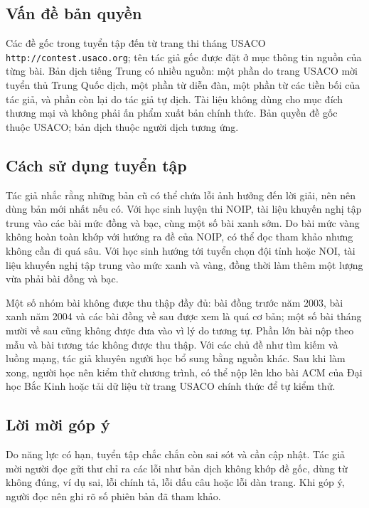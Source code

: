 \documentclass[11pt]{article}
\begin{document}
\subsection{Vấn đề bản quyền}

Các đề gốc trong tuyển tập đến từ trang thi tháng USACO
\texttt{http://contest.usaco.org}; tên tác giả gốc được đặt ở mục thông tin
nguồn của từng bài. Bản dịch tiếng Trung có nhiều nguồn: một phần do trang
USACO mời tuyển thủ Trung Quốc dịch, một phần từ diễn đàn, một phần từ các
tiền bối của tác giả, và phần còn lại do tác giả tự dịch. Tài liệu không dùng
cho mục đích thương mại và không phải ấn phẩm xuất bản chính thức. Bản quyền
đề gốc thuộc USACO; bản dịch thuộc người dịch tương ứng.

\subsection{Cách sử dụng tuyển tập}

Tác giả nhắc rằng những bản cũ có thể chứa lỗi ảnh hưởng đến lời giải, nên
nên dùng bản mới nhất nếu có. Với học sinh luyện thi NOIP, tài liệu khuyến
nghị tập trung vào các bài mức đồng và bạc, cùng một số bài xanh sớm. Do bài
mức vàng không hoàn toàn khớp với hướng ra đề của NOIP, có thể đọc tham khảo
nhưng không cần đi quá sâu. Với học sinh hướng tới tuyển chọn đội tỉnh hoặc
NOI, tài liệu khuyến nghị tập trung vào mức xanh và vàng, đồng thời làm thêm
một lượng vừa phải bài đồng và bạc.

Một số nhóm bài không được thu thập đầy đủ: bài đồng trước năm 2003, bài xanh
năm 2004 và các bài đồng về sau được xem là quá cơ bản; một số bài tháng mười
về sau cũng không được đưa vào vì lý do tương tự. Phần lớn bài nộp theo mẫu
và bài tương tác không được thu thập. Với các chủ đề như tìm kiếm và luồng
mạng, tác giả khuyên người học bổ sung bằng nguồn khác. Sau khi làm xong,
người học nên kiểm thử chương trình, có thể nộp lên kho bài ACM của Đại học
Bắc Kinh hoặc tải dữ liệu từ trang USACO chính thức để tự kiểm thử.

\subsection{Lời mời góp ý}

Do năng lực có hạn, tuyển tập chắc chắn còn sai sót và cần cập nhật. Tác giả
mời người đọc gửi thư chỉ ra các lỗi như bản dịch không khớp đề gốc, dùng từ
không đúng, ví dụ sai, lỗi chính tả, lỗi dấu câu hoặc lỗi dàn trang. Khi góp
ý, người đọc nên ghi rõ số phiên bản đã tham khảo.
\end{document}
